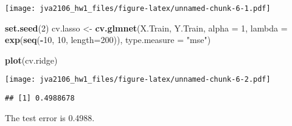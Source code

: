 \documentclass[]{article}
\newenvironment{Shaded}{\begin{snugshade}}{\end{snugshade}}
\newcommand{\KeywordTok}[1]{\textcolor[rgb]{0.13,0.29,0.53}{\textbf{#1}}}
\newcommand{\DataTypeTok}[1]{\textcolor[rgb]{0.13,0.29,0.53}{#1}}
\newcommand{\DecValTok}[1]{\textcolor[rgb]{0.00,0.00,0.81}{#1}}
\newcommand{\StringTok}[1]{\textcolor[rgb]{0.31,0.60,0.02}{#1}}
\newcommand{\OperatorTok}[1]{\textcolor[rgb]{0.81,0.36,0.00}{\textbf{#1}}}
\newcommand{\NormalTok}[1]{#1}
\begin{document}
\texttt{[image: jva2106\_hw1\_files/figure-latex/unnamed-chunk-6-1.pdf]}

\begin{Shaded}
\begin{Highlighting}[]
\KeywordTok{set.seed}\NormalTok{(}\DecValTok{2}\NormalTok{)}
\NormalTok{cv.lasso <-}\StringTok{ }\KeywordTok{cv.glmnet}\NormalTok{(X.Train, Y.Train, }
                      \DataTypeTok{alpha =} \DecValTok{1}\NormalTok{, }
                      \DataTypeTok{lambda =} \KeywordTok{exp}\NormalTok{(}\KeywordTok{seq}\NormalTok{(}\OperatorTok{-}\DecValTok{10}\NormalTok{, }\DecValTok{10}\NormalTok{, }\DataTypeTok{length=}\DecValTok{200}\NormalTok{)),}
                      \DataTypeTok{type.measure =} \StringTok{"mse"}\NormalTok{)}

\KeywordTok{plot}\NormalTok{(cv.ridge)}
\end{Highlighting}
\end{Shaded}

\texttt{[image: jva2106\_hw1\_files/figure-latex/unnamed-chunk-6-2.pdf]}

\begin{Shaded}
\end{Shaded}

\begin{Shaded}
\end{Shaded}

\begin{verbatim}
## [1] 0.4988678
\end{verbatim}

The test error is 0.4988.
\end{document}
